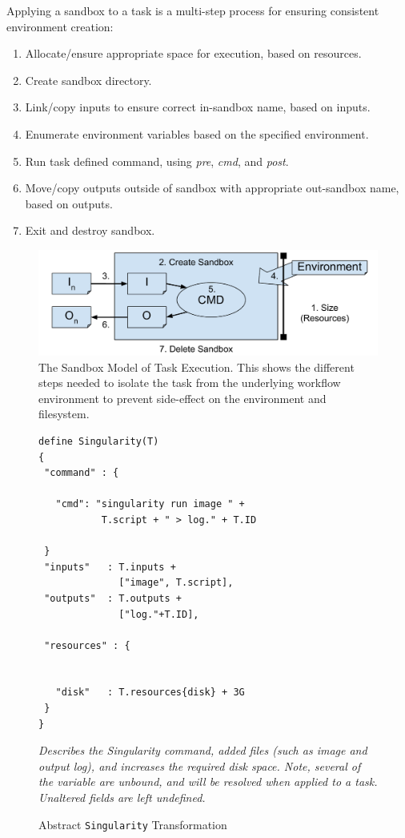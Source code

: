 \documentclass[conference]{IEEEtran}
\begin{document}
Applying a sandbox to a task is 
a multi-step process for ensuring consistent environment creation:
\begin{enumerate}
    \item Allocate/ensure appropriate space for execution, based on resources.
    \item Create sandbox directory.
    \item Link/copy inputs to ensure correct in-sandbox name, based on inputs.
    \item Enumerate environment variables based on the specified environment.
    \item Run task defined command, 
    using \emph{pre}, \emph{cmd}, and \emph{post}.
    \item Move/copy outputs outside of sandbox with appropriate out-sandbox name, based on outputs.
    \item Exit and destroy sandbox.
\end{enumerate}


\begin{figure}[H]
\includegraphics[width=\columnwidth]{graphics/sandboxing_short.pdf}
\caption{The Sandbox Model of Task Execution.
This shows the different steps needed to isolate
the task from the underlying workflow environment
to prevent side-effect on the environment and 
filesystem.}
\label{fig:sandbox}
\end{figure}


\begin{figure}[t]
\begin{framed}
\begin{verbatim}
define Singularity(T) 
{
 "command" : {
 
   "cmd": "singularity run image " +
           T.script + " > log." + T.ID
         
 }
 "inputs"   : T.inputs + 
              ["image", T.script],
 "outputs"  : T.outputs +
              ["log."+T.ID],
              
 "resources" : {
 
 
   "disk"   : T.resources{disk} + 3G
 }
}
\end{verbatim}
\end{framed}
\caption{Abstract {\tt Singularity} Transformation}
\small
\emph{Describes the Singularity command, added files
(such as image and output log), and increases
the required disk space. Note, several of the
variable are unbound, and will be resolved when
applied to a task. Unaltered fields are left
undefined.}
\label{sing-wrap}
\end{figure}
\end{document}
